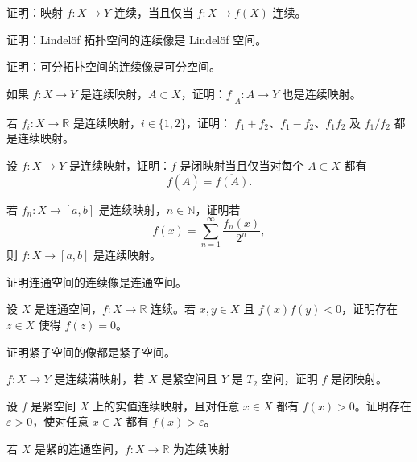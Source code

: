 \begin{homework}[12]
证明：映射 $f:X\to Y$ 连续，当且仅当 $f:X\to f(X)$ 连续。
\end{homework}

\begin{homework}[3]
证明：Lindelöf 拓扑空间的连续像是 Lindelöf 空间。
\end{homework}

\begin{homework}[4]
证明：可分拓扑空间的连续像是可分空间。
\end{homework}

\begin{homework}[14]
如果 $f:X\to Y$ 是连续映射，$A\subset X$，证明：$f|_A:A\to Y$ 也是连续映射。
\end{homework}

\begin{homework}[3.2]
若 $f_i:X\to\mathbb{R}$ 是连续映射，$i\in\{1,2\}$，证明：
$f_1+f_2$、$f_1-f_2$、$f_1f_2$ 及 $f_1/f_2$ 都是连续映射。
\end{homework}

\begin{homework}[3.6]
设 $f : X \to Y$ 是连续映射，证明：$f$ 是闭映射当且仅当对每个 $A \subset X$ 都有
\[
f(\overline{A}) = \overline{f(A)}.
\]
\end{homework}

\begin{homework}[3.3]
若 $f_n : X \to [a,b]$ 是连续映射，$n \in \mathbb{N}$，证明若
\[
f(x) = \sum_{n=1}^{\infty} \frac{f_n(x)}{2^n},
\]
则 $f : X \to [a,b]$ 是连续映射。
\end{homework}

\begin{homework}[2]
证明连通空间的连续像是连通空间。
\end{homework}

\begin{homework}[4.6]
设 $X$ 是连通空间，$f:X\to\mathbb R$ 连续。若 $x,y\in X$ 且 $f(x)f(y)<0$，证明存在 $z\in X$ 使得 $f(z)=0$。
\end{homework}

\begin{homework}[2]
证明紧子空间的像都是紧子空间。
\end{homework}

\begin{homework}[10]
$f:X\to Y$ 是连续满映射，若 $X$ 是紧空间且 $Y$ 是 $T_2$ 空间，证明 $f$ 是闭映射。
\end{homework}

\begin{homework}[5.5]
设 $f$ 是紧空间 $X$ 上的实值连续映射，且对任意 $x\in X$ 都有 $f(x)>0$。证明存在 $\varepsilon>0$，使对任意 $x\in X$ 都有 $f(x)>\varepsilon$。
\end{homework}

\begin{homework}[14]
若 $X$ 是紧的连通空间，$f:X\to\mathbb{R}$ 为连续映射
\end{homework}